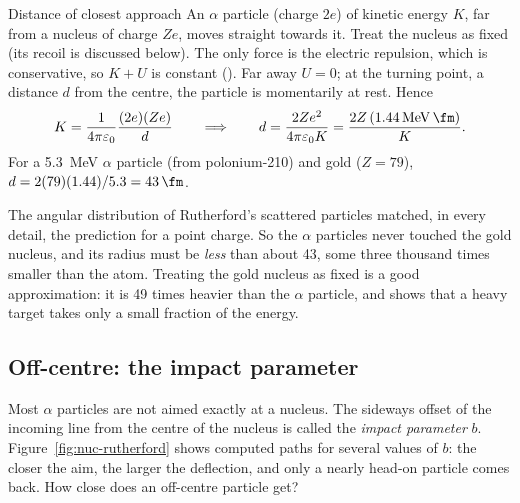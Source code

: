 \begin{derivbox}{Distance of closest approach}
An $\alpha$ particle (charge $2e$) of kinetic energy $K$, far from a nucleus of charge $Ze$, moves
straight towards it. Treat the nucleus as fixed (its recoil is discussed below). The only force is
the electric repulsion, which is conservative, so $K+U$ is constant (). Far away
$U=0$; at the turning point, a distance $d$ from the centre, the particle is momentarily at rest. Hence
\begin{equation}\label{eq:nuc-closest}
K=\frac{1}{4\pi\varepsilon_0}\frac{(2e)(Ze)}{d}
\qquad\Longrightarrow\qquad
d=\frac{2Ze^2}{4\pi\varepsilon_0 K}=\frac{2Z\,(\SI{1.44}{\MeV.\fm})}{K}.
\end{equation}
For a \SI{5.3}{\MeV} $\alpha$ particle (from polonium-210) and gold ($Z=79$),
$d=2(79)(1.44)/5.3=\SI{43}{\fm}$.
\end{derivbox}

The angular distribution of Rutherford's scattered particles matched, in every detail, the prediction for
a point charge. So the $\alpha$ particles never touched the gold nucleus, and its radius must be
\emph{less} than about \SI{43}{\fm}, some three thousand times smaller than the atom. Treating the gold
nucleus as fixed is a good approximation: it is 49 times heavier than the $\alpha$ particle, and
 shows that a heavy target takes only a small fraction of the energy.

\subsection{Off-centre: the impact parameter}
Most $\alpha$ particles are not aimed exactly at a nucleus. The sideways offset of the incoming line
from the centre of the nucleus is called the \emph{impact parameter} $b$. Figure~\ref{fig:nuc-rutherford}
shows computed paths for several values of $b$: the closer the aim, the larger the deflection, and
only a nearly head-on particle comes back. How close does an off-centre particle get?

\begin{figure}[htbp]
\centering
{}
\end{figure}

